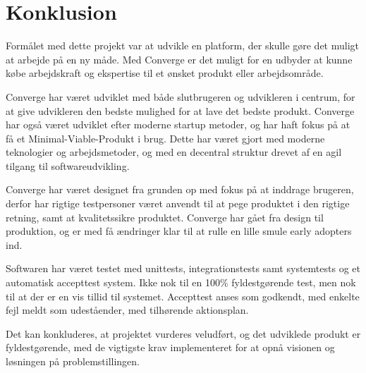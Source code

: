 \chapter{Konklusion}
\label{cha:conclusion}

Formålet med dette projekt var at udvikle en platform, der skulle gøre det muligt at arbejde på en ny måde. Med Converge er det muligt for en udbyder at kunne købe arbejdskraft og ekspertise til et ønsket produkt eller arbejdsområde.

Converge har været udviklet med både slutbrugeren og udvikleren i centrum, for at give udvikleren den bedste mulighed for at lave det bedste produkt. Converge har også været udviklet efter moderne startup metoder, og har haft fokus på at få et Minimal-Viable-Produkt i brug. Dette har været gjort med moderne teknologier og arbejdsmetoder, og med en decentral struktur drevet af en agil tilgang til softwareudvikling.

Converge har været designet fra grunden op med fokus på at inddrage brugeren, derfor har rigtige testpersoner været anvendt til at pege produktet i den rigtige retning, samt at kvalitetssikre produktet. Converge har gået fra design til produktion, og er med få ændringer klar til at rulle en lille smule early adopters ind.

Softwaren har været testet med unittests, integrationstests samt systemtests og et automatisk accepttest system. Ikke nok til en 100\% fyldestgørende test, men nok til at der er en vis tillid til systemet. Accepttest anses som godkendt, med enkelte fejl meldt som udeståender, med tilhørende aktionsplan.

Det kan konkluderes, at projektet vurderes veludført, og det udviklede produkt er fyldestgørende, med de vigtigste krav implementeret for at opnå visionen og løsningen på problemstillingen.

